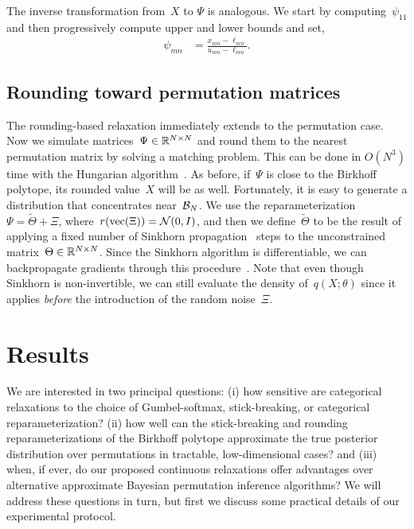 The inverse transformation from~$X$ to $\Psi$ is analogous.
We start by computing~$\psi_{11}$ and then progressively compute
upper and lower bounds and set,
\begin{align}
\psi_{mn} &= \frac{x_{mn} - \ell_{mn}}{u_{mn} - \ell_{mn}}.
\end{align}


\subsection{Rounding toward permutation matrices}

The rounding-based relaxation immediately extends to the permutation
case.  Now we simulate matrices~$\Psi \in \mathbb{R}^{N \times N}$ and
round them to the nearest permutation matrix by solving a matching
problem.  This can be done in $O(N^3)$ time with the Hungarian
algorithm~\citep{kuhn1955hungarian, munkres1957algorithms}.  As
before, if~$\Psi$ is close to the Birkhoff polytope, its rounded
value~$X$ will be as well.  Fortunately, it is easy to generate a
distribution that concentrates near~$\mathcal{B}_N$.  We use the
reparameterization~${\Psi = \widetilde{\Theta} + \Xi}$,
where~${r(\operatorname{vec}(\Xi)) = \mathcal{N}(0, I)}$, and then we
define~${\widetilde{\Theta}}$ to be the
result of applying a fixed number of Sinkhorn propagation~\citep{knight2008sinkhorn} steps
to the unconstrained matrix~$\Theta \in \mathbb{R}^{N \times N}$.
Since the Sinkhorn algorithm is differentiable, we can backpropagate
gradients through this procedure~\citep[c.f.][]{adams2011ranking}.
Note that even though Sinkhorn is non-invertible, we can still
evaluate the density of~$q(X; \theta)$ since it applies \emph{before}
the introduction of the random noise~$\Xi$. 


\section{Results}
\label{sec:results}

We are interested in two principal questions: (i) how sensitive
are categorical relaxations to the choice of Gumbel-softmax,
stick-breaking, or categorical reparameterization? (ii) how
well can the stick-breaking and rounding reparameterizations
of the Birkhoff polytope approximate the true posterior distribution
over permutations in tractable, low-dimensional cases? and (iii)
when, if ever, do our proposed continuous relaxations offer
advantages over alternative approximate Bayesian permutation
inference algorithms?  We will address these questions in turn,
but first we discuss some practical details of our experimental
protocol.

